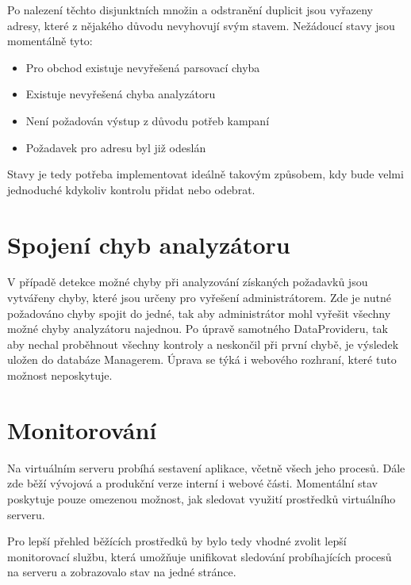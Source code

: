 \documentclass[thesis=B,czech]{FITthesis}[2012/06/26]
\begin{document}
Po nalezení těchto disjunktních množin a odstranění duplicit jsou vyřazeny adresy, které z nějakého důvodu nevyhovují svým stavem.
Nežádoucí stavy jsou momentálně tyto:

\begin{itemize}
\item Pro obchod existuje nevyřešená parsovací chyba
\item Existuje nevyřešená chyba analyzátoru
\item Není požadován výstup z důvodu potřeb kampaní
\item Požadavek pro adresu byl již odeslán
\end{itemize}

Stavy je tedy potřeba implementovat ideálně takovým způsobem, kdy bude velmi jednoduché 
kdykoliv kontrolu přidat nebo odebrat.

\section{Spojení chyb analyzátoru}
V případě detekce možné chyby při analyzování získaných požadavků jsou vytvářeny chyby, které jsou určeny pro vyřešení administrátorem.
Zde je nutné požadováno chyby spojit do jedné, tak aby administrátor mohl vyřešit všechny možné chyby analyzátoru najednou.
Po úpravě samotného DataProvideru, tak aby nechal proběhnout všechny kontroly a neskončil při první chybě, je výsledek uložen do databáze
Managerem. Úprava se týká i webového rozhraní, které tuto možnost neposkytuje.

\section{Monitorování}
Na virtuálním serveru probíhá sestavení aplikace, včetně všech jeho procesů. Dále zde běží vývojová a produkční verze interní i webové části.
Momentální stav poskytuje pouze omezenou možnost, jak sledovat využití prostředků virtuálního serveru.
\par
Pro lepší přehled běžících prostředků by bylo tedy vhodné zvolit lepší monitorovací službu, která umožňuje unifikovat sledování
probíhajících procesů na serveru a zobrazovalo stav na jedné stránce.
\end{document}
